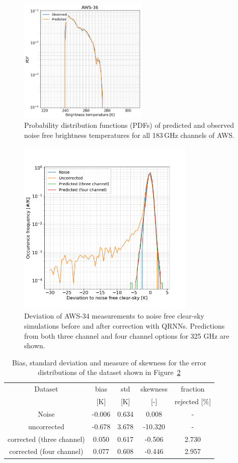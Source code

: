 \documentclass[12pt]{article}
\begin{document}
\begin{figure}[!tb]
	\includegraphics[height=60mm]{distribution_predicted_C36}
	\caption{ Probability distribution functions (PDFs) of predicted and observed noise free brightness temperatures for all 183\,GHz channels of AWS.  }
	\label{fig:pdf:qrnn}
\end{figure}


\begin{figure}[!tb]
	\centering
	\includegraphics[height=85mm]{Channel_C34.png}
	\caption{Deviation of AWS-34 measurements to noise free clear-sky
		simulations before and after correction with QRNNs. Predictions from both three channel and four channel options for 325 GHz are shown. }
	\label{fig:qrnn_C34:deviations}
\end{figure}

\begin{table}[!tb]
	\centering
	\begin{tabular}[b]{c|c|c|c|c}
	Dataset  		  &   bias &   std &   skewness & fraction  \\
	&   [K]  &   [K] & [-] & rejected [\%]\\
		\hline
Noise                     & -0.006 & 0.634 &              0.008 &      - \\
uncorrected               & -0.678 & 3.678 &            -10.320 &     - \\
corrected (three channel) &  0.050 & 0.617 &             -0.506 &      2.730 \\
corrected (four channel)  &  0.077 & 0.608 &             -0.446 &      2.957 \\
		\hline
	\end{tabular}
	\caption{ Bias, standard deviation and measure of skewness for the error distributions of the dataset shown in Figure~\ref{fig:qrnn_C34:deviations}}
	\label{tab:qrnn:C34}
\end{table}
\end{document}

